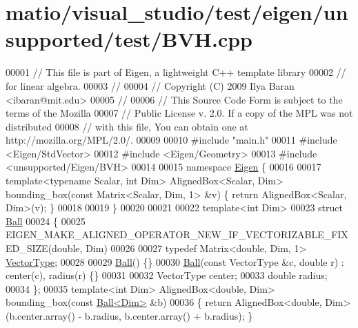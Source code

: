 \hypertarget{matio_2visual__studio_2test_2eigen_2unsupported_2test_2_b_v_h_8cpp_source}{}\section{matio/visual\+\_\+studio/test/eigen/unsupported/test/\+B\+VH.cpp}
\label{matio_2visual__studio_2test_2eigen_2unsupported_2test_2_b_v_h_8cpp_source}

\begin{DoxyCode}
00001 \textcolor{comment}{// This file is part of Eigen, a lightweight C++ template library}
00002 \textcolor{comment}{// for linear algebra.}
00003 \textcolor{comment}{//}
00004 \textcolor{comment}{// Copyright (C) 2009 Ilya Baran <ibaran@mit.edu>}
00005 \textcolor{comment}{//}
00006 \textcolor{comment}{// This Source Code Form is subject to the terms of the Mozilla}
00007 \textcolor{comment}{// Public License v. 2.0. If a copy of the MPL was not distributed}
00008 \textcolor{comment}{// with this file, You can obtain one at http://mozilla.org/MPL/2.0/.}
00009 
00010 \textcolor{preprocessor}{#include "main.h"}
00011 \textcolor{preprocessor}{#include <Eigen/StdVector>}
00012 \textcolor{preprocessor}{#include <Eigen/Geometry>}
00013 \textcolor{preprocessor}{#include <unsupported/Eigen/BVH>}
00014 
00015 \textcolor{keyword}{namespace }\hyperlink{namespace_eigen}{Eigen} \{
00016 
00017 \textcolor{keyword}{template}<\textcolor{keyword}{typename} Scalar, \textcolor{keywordtype}{int} Dim> AlignedBox<Scalar, Dim> bounding\_box(\textcolor{keyword}{const} Matrix<Scalar, Dim, 1> &v) \{ \textcolor{keywordflow}{
      return} AlignedBox<Scalar, Dim>(v); \}
00018 
00019 \}
00020 
00021 
00022 \textcolor{keyword}{template}<\textcolor{keywordtype}{int} Dim>
00023 \textcolor{keyword}{struct }\hyperlink{struct_ball}{Ball}
00024 \{
00025 EIGEN\_MAKE\_ALIGNED\_OPERATOR\_NEW\_IF\_VECTORIZABLE\_FIXED\_SIZE(\textcolor{keywordtype}{double}, Dim)
00026 
00027   \textcolor{keyword}{typedef} Matrix<double, Dim, 1> \hyperlink{struct_vector_type}{VectorType};
00028 
00029   \hyperlink{struct_ball}{Ball}() \{\}
00030   \hyperlink{struct_ball}{Ball}(\textcolor{keyword}{const} VectorType &c, \textcolor{keywordtype}{double} r) : center(c), radius(r) \{\}
00031 
00032   VectorType center;
00033   \textcolor{keywordtype}{double} radius;
00034 \};
00035 \textcolor{keyword}{template}<\textcolor{keywordtype}{int} Dim> AlignedBox<double, Dim> bounding\_box(\textcolor{keyword}{const} \hyperlink{struct_ball}{Ball<Dim>} &b)
00036 \{ \textcolor{keywordflow}{return} AlignedBox<double, Dim>(b.center.array() - b.radius, b.center.array() + b.radius); \}

\end{DoxyCode}
